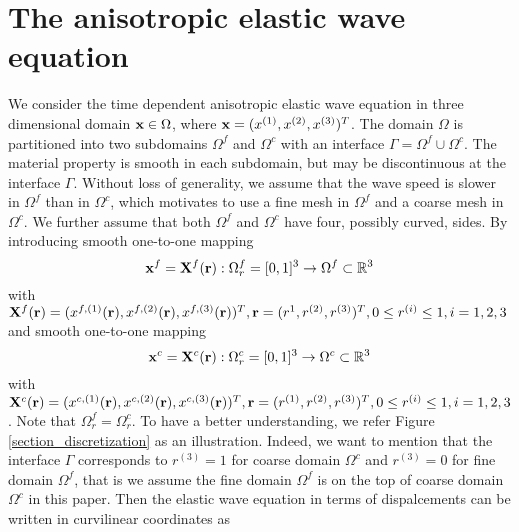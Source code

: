 \section{The anisotropic elastic wave equation }
We consider the time dependent anisotropic elastic wave equation in three dimensional domain ${\bf x}\in\Omega$, where ${\bf x} = (x^{(1)},x^{(2)},x^{(3)})^T$. 
The domain $\Omega$ is partitioned into two subdomains $\Omega^f$ and $\Omega^c$ with an interface $\Gamma = \Omega^f\cup\Omega^c$. The material property is smooth in each subdomain, but may be discontinuous at the interface $\Gamma$. Without loss of generality, we assume that the wave speed is slower in $\Omega^f$ than in $\Omega^c$, which motivates to use a fine mesh in $\Omega^f$ and a coarse mesh in $\Omega^c$.  We further assume that both $\Omega^f$ and $\Omega^c$ have four, possibly curved, sides. By introducing smooth one-to-one mapping
\[{\bf x}^{f} = {\bf X}^{f}({\bf r}) : \Omega^f_r = [0,1]^3 \rightarrow \Omega^{f} \subset \mathbb{R}^3 \]
with ${\bf X}^{f}({\bf r}) = (x^{f,(1)}({\bf r}),x^{f,(2)}({\bf r}),x^{f,(3)}({\bf r}))^T, {\bf r} = (r^{1},r^{(2)},r^{(3)})^T, 0\leq r^{(i)}\leq1, i = 1,2,3$
and smooth one-to-one mapping 
\[{\bf x}^{c} = {\bf X}^{c}({\bf r}) : \Omega^c_r = [0,1]^3 \rightarrow \Omega^{c} \subset \mathbb{R}^3\]
 with ${\bf X}^{c}({\bf r}) = (x^{c,(1)}({\bf r}),x^{c,(2)}({\bf r}),x^{c,(3)}({\bf r}))^T, {\bf r} = (r^{(1)},r^{(2)},r^{(3)})^T, 0\leq r^{(i)}\leq1, i = 1,2,3$. Note that $\Omega^f_r = \Omega^c_r$. To have a better understanding, we refer Figure \ref{section_discretization} as an illustration. Indeed, we want to mention that the interface $\Gamma$ corresponds to $r^{(3)} = 1$ for coarse domain $\Omega^c$ and $r^{(3)} = 0$ for fine domain $\Omega^f$, that is we assume the fine domain $\Omega^f$ is on the top of coarse domain $\Omega^c$ in this paper. Then the elastic wave equation in terms of dispalcements can be written in curvilinear coordinates as
